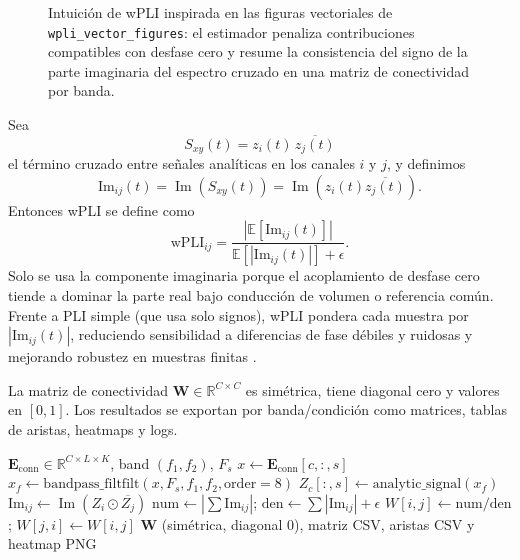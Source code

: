 \begin{fullwidth}
\begin{figure}[H]
\centering
\resizebox{0.92\fulltextwidth}{!}{\NSWPLIIntuition}
\caption{Intuición de wPLI inspirada en las figuras vectoriales de \texttt{wpli\_vector\_figures}: el estimador penaliza contribuciones compatibles con desfase cero y resume la consistencia del signo de la parte imaginaria del espectro cruzado en una matriz de conectividad por banda.}
\label{fig:generated-wpli-intuition}
\end{figure}
\end{fullwidth}

Sea
\[
S_{xy}(t)=z_i(t)\,\overline{z_j(t)}
\]
el término cruzado entre señales analíticas en los canales $i$ y $j$, y definimos
\[
\mathrm{Im}_{ij}(t)=\operatorname{Im}\!\left(S_{xy}(t)\right)=\operatorname{Im}\!\left(z_i(t)\overline{z_j(t)}\right).
\]
Entonces wPLI se define como
\[
\mathrm{wPLI}_{ij}
=
\frac{\left|\mathbb{E}\left[\mathrm{Im}_{ij}(t)\right]\right|}
{\mathbb{E}\left[\left|\mathrm{Im}_{ij}(t)\right|\right]+\epsilon}.
\]
Solo se usa la componente imaginaria porque el acoplamiento de desfase cero tiende a dominar la parte real bajo conducción de volumen o referencia común. Frente a PLI simple (que usa solo signos), wPLI pondera cada muestra por $|\mathrm{Im}_{ij}(t)|$, reduciendo sensibilidad a diferencias de fase débiles y ruidosas y mejorando robustez en muestras finitas \citep{Vinck2011WPLI}.

La matriz de conectividad $\mathbf{W}\in\mathbb{R}^{C\times C}$ es simétrica, tiene diagonal cero y valores en $[0,1]$. Los resultados se exportan por banda/condición como matrices, tablas de aristas, heatmaps y logs.

\begin{algorithm}[H]
\caption{Cálculo de wPLI por banda (como en \texttt{wPLI.jl})}
\begin{algorithmic}
\Require $\mathbf{E}_{\mathrm{conn}}\in\mathbb{R}^{C\times L\times K}$, band $(f_1,f_2)$, $F_s$
    \State $x\gets \mathbf{E}_{\mathrm{conn}}[c,:,s]$ 
    \State $x_f\gets \mathrm{bandpass\_filtfilt}(x,F_s,f_1,f_2,\mathrm{order}=8)$
    \State $Z_c[:,s]\gets \mathrm{analytic\_signal}(x_f)$ 
  \EndFor
\EndFor
{}
    \State $\mathrm{Im}_{ij}\gets \operatorname{Im}(Z_i\odot \overline{Z_j})$
    \State $\mathrm{num}\gets |\sum \mathrm{Im}_{ij}|$;\; $\mathrm{den}\gets \sum |\mathrm{Im}_{ij}|+\epsilon$
    \State $W[i,j]\gets \mathrm{num}/\mathrm{den}$;\; $W[j,i]\gets W[i,j]$
  \EndFor
\EndFor
\Ensure $\mathbf{W}$ (simétrica, diagonal 0), matriz CSV, aristas CSV y heatmap PNG
\end{algorithmic}
\end{algorithm}

